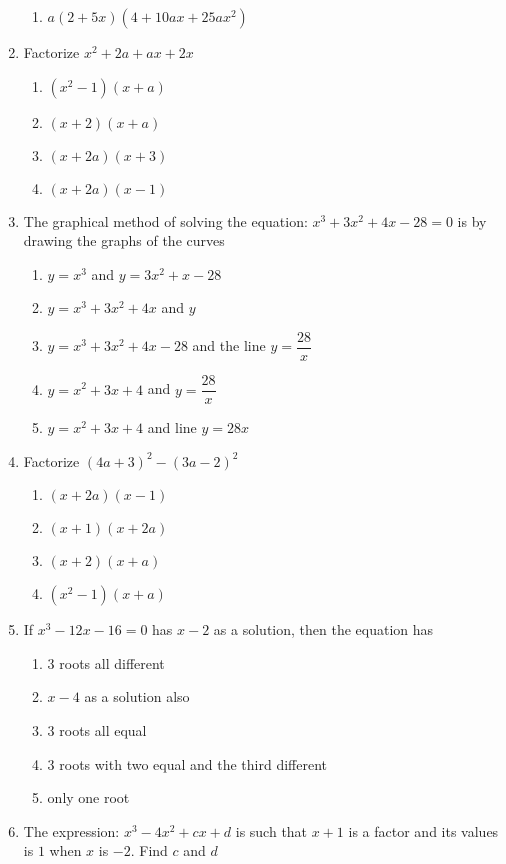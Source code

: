 \begin{multicols}{2}
\begin{enumerate}[label={\arabic*.}]
\begin{enumerate}[label={\Alph*.}]
	\item \(a(2+5x)(4+10ax+25a{x}^{2})\)
	\end{enumerate}
\item Factorize \({x}^{2}+2a+ax+2x\)
	\begin{enumerate}[label={\Alph*.}]
	\item \(({x}^{2}-1)(x+a)\)
	\item \((x+2)(x+a)\)
	\item \((x+2a)(x+3)\)
	\item \((x+2a)(x-1)\)
	\end{enumerate}
\item The graphical method of solving the equation: \({x}^{3}+3{x}^{2}+4x-28 = 0\) is by drawing the graphs of the curves
	\begin{enumerate}[label={\Alph*.}]
	\item \(y = {x}^{3}\) and \(y=3{x}^{2} + x -28\)
	\item \(y={x}^{3}+3{x}^{2}+4x\) and \(y\)
	\item \(y={x}^{3}+3{x}^{2}+4x-28\) and the line \(y=\dfrac{28}{x}\)
	\item \(y={x}^{2}+3x+4\) and \(y=\dfrac{28}{x}\)
	\item \(y={x}^{2}+3x+4\) and line \(y=28x\)
	\end{enumerate}
\item Factorize \((4a+3)^2-(3a-2)^2\)
	\begin{enumerate}[label={\Alph*.}]
	\item \((x+2a)(x-1)\)
	\item \((x+1)(x+2a)\)
	\item \((x+2)(x+a)\)
	\item \(({x}^{2}-1)(x+a)\)
	\end{enumerate}
\item If \({x}^{3} - 12x - 16 = 0\) has \(x-2\) as a solution, then the equation has
	\begin{enumerate}[label={\Alph*.}]
	\item 3 roots all different
	\item \(x-4\) as a solution also
	\item \(3\) roots all equal
	\item \(3\) roots with two equal and the third different
	\item only one root
	\end{enumerate}
\item The expression: \({x}^{3}-4{x}^{2}+cx+d\) is such that \(x+1\) is a factor and its values is \(1\) when \(x\) is \(-2\). Find \(c\) and \(d\)

\end{enumerate}
\end{multicols}
